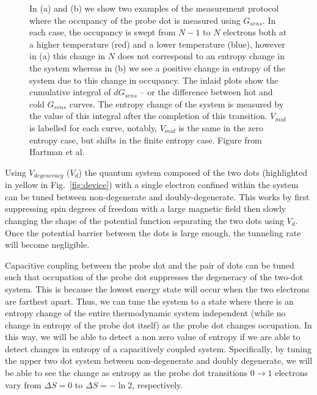 \begin{figure}[h]
\centering
{}
\caption{ In (a) and (b) we show two examples of the measurement protocol where the occupancy of the probe dot is measured using $G_{sens}$. In each case, the occupancy is swept from $N - 1$ to $N$ electrons both at a higher temperature (red) and a lower temperature (blue), however in (a) this change in $N$ does not correspond to an entropy change in the system whereas in (b) we see a positive change in entropy of the system due to this change in occupancy. The inlaid plots show the cumulative integral of $d G_{sens}$ -- or the difference between hot and cold $G_{sens}$ curves. The entropy change of the system is measured by the value of this integral after the completion of this transition. $V_{mid}$ is labelled for each curve, notably, $V_{mid}$ is the same in the zero entropy case, but shifts in the finite entropy case. Figure from Hartman et al.}
\label{fig:num_int}       %
\end{figure}

Using $V_{degeneracy}$ ($V_d$) the quantum system composed of the two dots (highlighted in yellow in Fig.~\ref{fig:device}) with a single electron confined within the system can be tuned between non-degenerate and doubly-degenerate. This works by first suppressing spin degrees of freedom with a large magnetic field then slowly changing the shape of the potential function separating the two dots using $V_d$. Once the potential barrier between the dots is large enough, the tunneling rate will become negligible.

Capacitive coupling between the probe dot and the pair of dots can be tuned such that occupation of the probe dot suppresses the degeneracy of the two-dot system. This is because the lowest energy state will occur when the two electrons are farthest apart. Thus, we can tune the system to a state where there is an entropy change of the entire thermodynamic system independent (while no change in entropy of the probe dot itself) as the probe dot changes occupation. In this way, we will be able to detect a non zero value of entropy if we are able to detect changes in entropy of a capacitively coupled system. Specifically, by tuning the upper two dot system between non-degenerate and doubly degenerate, we will be able to see the change as entropy as the probe dot transitions $0 \to 1$ electrons vary from $\Delta S = 0$ to $\Delta S = -\ln2$, respectively.

